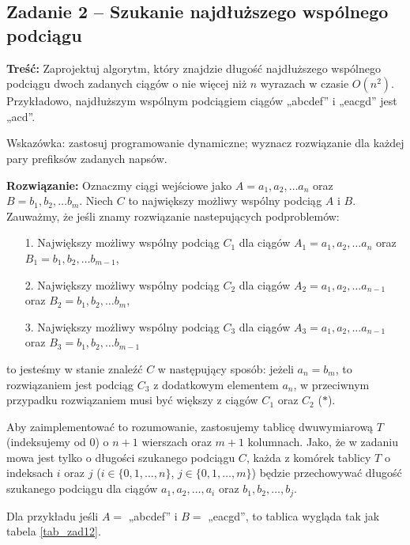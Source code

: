 \subsection{Zadanie 2 -- Szukanie najdłuższego wspólnego podciągu}
\textbf{Treść:} Zaprojektuj algorytm, który znajdzie długość najdłuższego wspólnego podciągu dwoch zadanych ciągów
o nie więcej niż $n$ wyrazach w czasie $O(n^2)$. Przykładowo, najdłuższym wspólnym podciągiem 
ciągów „abcdef” i „eacgd” jest „acd”.

Wskazówka: zastosuj programowanie dynamiczne; wyznacz rozwiązanie dla każdej pary prefiksów zadanych napsów.

\textbf{Rozwiązanie:}
Oznaczmy ciągi wejściowe jako 
$A = a_1, a_2, \dots a_n$ oraz 
$B = b_1, b_2, \dots b_m$. Niech $C$ to największy możliwy
wspólny podciąg $A$ i $B$.  Zauważmy, że jeśli znamy rozwiązanie
nastepujących podproblemów:
\begin{itemize}
	\item[1.] Największy możliwy wspólny podciąg $C_1$ dla ciągów $A_1=a_1, a_2, \dots a_n$ oraz 
	$B_1=b_1, b_2, \dots b_{m-1}$,
	\item[2.] Największy możliwy wspólny podciąg $C_2$ dla ciągów $A_2 =a_1, a_2, \dots a_{n-1}$ oraz 
	$B_2=b_1, b_2, \dots b_{m}$,
	\item[3.] Największy możliwy wspólny podciąg $C_3$ dla ciągów $A_3=a_1, a_2, \dots a_{n-1}$ oraz 
	$B_3=b_1, b_2, \dots b_{m-1}$
\end{itemize}
to jesteśmy w stanie znaleźć $C$
w następujący sposób: jeżeli $a_n = b_m$, to rozwiązaniem 
jest podciąg $C_3$ z dodatkowym elementem $a_n$, w przeciwnym przypadku
rozwiązaniem musi być większy z ciągów $C_1$ oraz $C_2$ ($\ast$). 

Aby zaimplementować to rozumowanie, zastosujemy tablicę dwuwymiarową $T$ 
(indeksujemy od 0)
o $n+1$ wierszach oraz $m+1$ kolumnach. Jako, że w zadaniu mowa jest 
tylko o długości szukanego podciągu $C$, każda z komórek tablicy $T$ 
o indeksach $i$ oraz $j$ ($i \in \{0,1, \dots, n\}$, 
$j \in \{0,1, \dots, m\}$) będzie 
przechowywać długość szukanego podciągu dla ciągów 
$a_1, a_2, \dots, a_i$ oraz $b_1, b_2, \dots, b_j$. 

Dla przykładu 
jeśli $A = $ „abcdef” i  $B = $ „eacgd”, to tablica 
wygląda tak jak tabela \ref{tab_zad12}.



